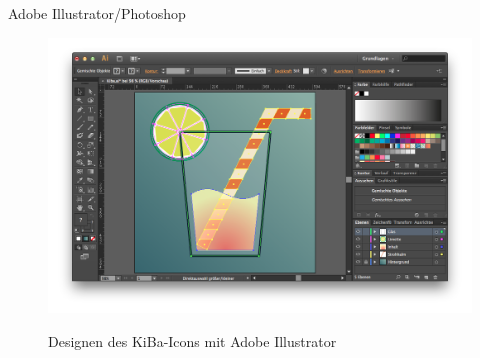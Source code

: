 Adobe Illustrator/Photoshop
\begin{figure}
	\centering
	\includegraphics[scale=.3]{Pictures/IllustratorIcon}
	\label{fig:IllustratorIcon}
	\caption{Designen des KiBa-Icons mit Adobe Illustrator}
\end{figure}